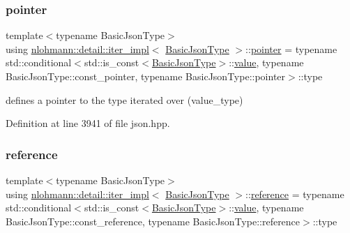\mbox{\label{classnlohmann_1_1detail_1_1iter__impl_a69e52f890ce8c556fd68ce109e24b360}} 
\subsubsection{\texorpdfstring{pointer}{pointer}}
{\footnotesize\ttfamily template$<$typename Basic\+Json\+Type$>$ \\
using \hyperlink{classnlohmann_1_1detail_1_1iter__impl}{nlohmann\+::detail\+::iter\+\_\+impl}$<$ \hyperlink{classnlohmann_1_1detail_1_1iter__impl_abf18f18793f84b0222aebb5a2a87da7a}{Basic\+Json\+Type} $>$\+::\hyperlink{classnlohmann_1_1detail_1_1iter__impl_a69e52f890ce8c556fd68ce109e24b360}{pointer} =  typename std\+::conditional$<$std\+::is\+\_\+const$<$\hyperlink{classnlohmann_1_1detail_1_1iter__impl_abf18f18793f84b0222aebb5a2a87da7a}{Basic\+Json\+Type}$>$\+::\hyperlink{classnlohmann_1_1detail_1_1iter__impl_ab447c50354c6611fa2ae0100ac17845c}{value}, typename Basic\+Json\+Type\+::const\+\_\+pointer, typename Basic\+Json\+Type\+::pointer$>$\+::type}



defines a pointer to the type iterated over (value\+\_\+type) 



Definition at line 3941 of file json.\+hpp.

\mbox{\label{classnlohmann_1_1detail_1_1iter__impl_a5be8001be099c6b82310f4d387b953ce}} 
\subsubsection{\texorpdfstring{reference}{reference}}
{\footnotesize\ttfamily template$<$typename Basic\+Json\+Type$>$ \\
using \hyperlink{classnlohmann_1_1detail_1_1iter__impl}{nlohmann\+::detail\+::iter\+\_\+impl}$<$ \hyperlink{classnlohmann_1_1detail_1_1iter__impl_abf18f18793f84b0222aebb5a2a87da7a}{Basic\+Json\+Type} $>$\+::\hyperlink{classnlohmann_1_1detail_1_1iter__impl_a5be8001be099c6b82310f4d387b953ce}{reference} =  typename std\+::conditional$<$std\+::is\+\_\+const$<$\hyperlink{classnlohmann_1_1detail_1_1iter__impl_abf18f18793f84b0222aebb5a2a87da7a}{Basic\+Json\+Type}$>$\+::\hyperlink{classnlohmann_1_1detail_1_1iter__impl_ab447c50354c6611fa2ae0100ac17845c}{value}, typename Basic\+Json\+Type\+::const\+\_\+reference, typename Basic\+Json\+Type\+::reference$>$\+::type}



